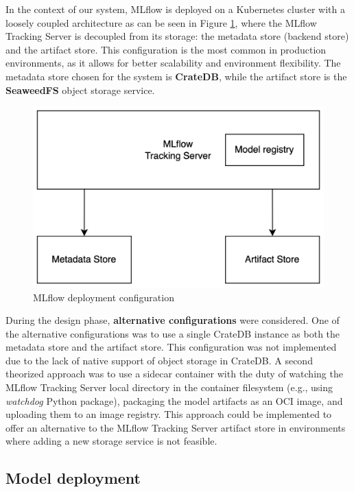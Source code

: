 In the context of our system, MLflow is deployed on a Kubernetes cluster with a loosely coupled architecture as can be seen in Figure \ref{fig:mlflow_config}, where the MLflow Tracking Server is decoupled from its storage: the metadata store (backend store) and the artifact store.
This configuration is the most common in production environments, as it allows for better scalability and environment flexibility.
The metadata store chosen for the system is \textbf{CrateDB}, while the artifact store is the \textbf{SeaweedFS} object storage service. \\

\begin{figure}[t]
  \centering
  \includegraphics[width=0.50\linewidth]{images/mlflow_config.png}
  \caption{MLflow deployment configuration}
  \label{fig:mlflow_config}
\end{figure}

During the design phase, \textbf{alternative configurations} were considered.
One of the alternative configurations was to use a single CrateDB instance as both the metadata store and the artifact store. This configuration was not implemented due to the lack of native support of object storage in CrateDB.
A second theorized approach was to use a sidecar container with the duty of watching the MLflow Tracking Server local directory in the container filesystem (e.g., using \textit{watchdog} Python package), packaging the model artifacts as an OCI image, and uploading them to an image registry. This approach could be implemented to offer an alternative to the MLflow Tracking Server artifact store in environments where adding a new storage service is not feasible.

\subsection{Model deployment}
\label{sec:model_deployment}

